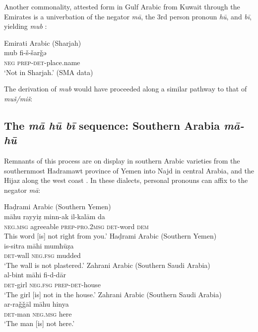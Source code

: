 \documentclass[output=paper]{langsci/langscibook}
\begin{document}
Another commonality, attested form in Gulf Arabic from Kuwait through the Emirates is a univerbation of the negator \textit{mā}, the 3rd person pronoun \textit{hū}, and \textit{bī}, yielding \textit{mub} \citep[64, 73, 116, 243]{holes1990a}:

\ea Emirati Arabic (Sharjah)\label{ex:WiAR-29}\\
	\gll mub fi-š-šarǧǝ\\
	\textsc{neg} \textsc{prep-det}-place.name\\
	\glt ‘Not in Sharjah.’ (SMA data)
\z

The derivation of \textit{mub} would have proceeded along a similar pathway to that of \textit{muš/miš}:

\begin{exe}\label{ex:WiAR-30}  \end{exe}

\subsection{The \textit{mā hū bī} sequence: Southern Arabia \textit{mā-hū}} \label{s:WiAR-4.3}

Remnants of this process are on display in southern Arabic varieties from the southernmost Hadramawt province of Yemen \citep[185--186]{al-saqqaf1999a} into Najd \citep[44]{ingham1994a} in central Arabia, and the Hijaz along the west coast \citep[41]{omar1975a}. In these dialects, personal pronouns can affix to the negator \textit{mā}:

\ea \label{ex:WiAR-31}
  \ea Haḍrami Arabic (Southern Yemen)\\
  	\gll māhu rayyiẓ minn-ak il-kalām da\\
  	\textsc{neg.msg} agreeable \textsc{prep-pro.2msg} \textsc{det}-word \textsc{dem}\\
  	\glt This word [is] not right from you.’ \citep[186]{al-saqqaf1999a}
  \ex Haḍrami Arabic (Southern Yemen)\\
  	\gll is-sitra māhi mumħūẓa\\
  	\textsc{det}-wall \textsc{neg.fsg} mudded\\
	\glt ‘The wall is not plastered.’ \citep[186]{al-saqqaf1999a}
  \ex Zahrani Arabic (Southern Saudi Arabia)\\
  	\gll al-bint māhi fi-d-dār\\
  	\textsc{det}-girl \textsc{neg.fsg} \textsc{prep-det}-house\\
	\glt ‘The girl [is] not in the house.’ \citep[305]{alzahrani2015a}
  \ex Zahrani Arabic (Southern Saudi Arabia)\\
  	\gll ar-raǧǧāl māhu hinya\\
  	\textsc{det}-man \textsc{neg.msg} here\\
  	\glt ‘The man [is] not here.' \citep[307]{alzahrani2015a}
\z \z
\end{document}

